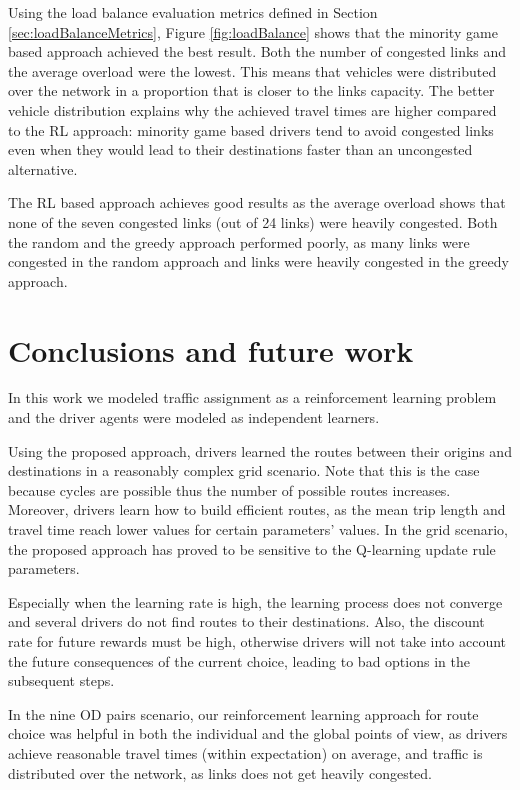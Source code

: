 \documentclass{RITA}
\begin{document}
Using the load balance evaluation metrics defined in Section \ref{sec:loadBalanceMetrics}, Figure \ref{fig:loadBalance} shows that the minority game based approach achieved the best result. Both the number of congested links and the average overload were the lowest. This means that vehicles were distributed over the network in a proportion that is closer to the links capacity. The better vehicle distribution explains why the achieved travel times are higher compared to the RL approach: minority game based drivers tend to avoid congested links even when they would lead to their destinations faster than an uncongested alternative. 

The RL based approach achieves good results as the average overload shows that none of the seven congested links (out of 24 links) were heavily congested. Both the random and the greedy approach performed poorly, as many links were congested in the random approach and links were heavily congested in the greedy approach.



\section{Conclusions and future work}
\label{sec:conclusions}

In this work we modeled traffic assignment as a reinforcement learning problem and the driver agents were modeled as independent learners.

Using the proposed approach, drivers learned the routes between their origins and destinations in a reasonably complex grid scenario. Note that this is the case because cycles are possible thus the number of possible routes increases. Moreover, drivers learn how to build efficient routes, as the mean trip length and travel time reach lower values for certain parameters' values. In the grid scenario, the proposed approach has proved to be sensitive to the Q-learning update rule parameters. 

Especially when the learning rate is high, the learning process does not converge and several drivers do not find routes to their destinations. Also, the discount rate for future rewards must be high, otherwise drivers will not take into account the future consequences of the current choice, leading to bad options in the subsequent steps.

In the nine OD pairs scenario, our reinforcement learning approach for route choice was helpful in both the individual and the global points of view, as drivers achieve reasonable travel times (within expectation) on average, and traffic is distributed over the network, as links does not get heavily congested.
\end{document}

